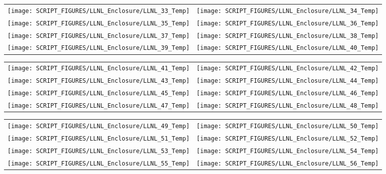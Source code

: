 \begin{figure}[!ht]
\begin{tabular*}{\textwidth}{l@{\extracolsep{\fill}}r}
\texttt{[image: SCRIPT\_FIGURES/LLNL\_Enclosure/LLNL\_33\_Temp]} &
\texttt{[image: SCRIPT\_FIGURES/LLNL\_Enclosure/LLNL\_34\_Temp]} \\
\texttt{[image: SCRIPT\_FIGURES/LLNL\_Enclosure/LLNL\_35\_Temp]} &
\texttt{[image: SCRIPT\_FIGURES/LLNL\_Enclosure/LLNL\_36\_Temp]} \\
\texttt{[image: SCRIPT\_FIGURES/LLNL\_Enclosure/LLNL\_37\_Temp]} &
\texttt{[image: SCRIPT\_FIGURES/LLNL\_Enclosure/LLNL\_38\_Temp]} \\
\texttt{[image: SCRIPT\_FIGURES/LLNL\_Enclosure/LLNL\_39\_Temp]} &
\texttt{[image: SCRIPT\_FIGURES/LLNL\_Enclosure/LLNL\_40\_Temp]}
\end{tabular*}
\label{LLNL_Enclosure_Temp_5}
\end{figure}

\begin{figure}[!ht]
\begin{tabular*}{\textwidth}{l@{\extracolsep{\fill}}r}
\texttt{[image: SCRIPT\_FIGURES/LLNL\_Enclosure/LLNL\_41\_Temp]} &
\texttt{[image: SCRIPT\_FIGURES/LLNL\_Enclosure/LLNL\_42\_Temp]} \\
\texttt{[image: SCRIPT\_FIGURES/LLNL\_Enclosure/LLNL\_43\_Temp]} &
\texttt{[image: SCRIPT\_FIGURES/LLNL\_Enclosure/LLNL\_44\_Temp]} \\
\texttt{[image: SCRIPT\_FIGURES/LLNL\_Enclosure/LLNL\_45\_Temp]} &
\texttt{[image: SCRIPT\_FIGURES/LLNL\_Enclosure/LLNL\_46\_Temp]} \\
\texttt{[image: SCRIPT\_FIGURES/LLNL\_Enclosure/LLNL\_47\_Temp]} &
\texttt{[image: SCRIPT\_FIGURES/LLNL\_Enclosure/LLNL\_48\_Temp]}
\end{tabular*}
\label{LLNL_Enclosure_Temp_6}
\end{figure}

\begin{figure}[!ht]
\begin{tabular*}{\textwidth}{l@{\extracolsep{\fill}}r}
\texttt{[image: SCRIPT\_FIGURES/LLNL\_Enclosure/LLNL\_49\_Temp]} &
\texttt{[image: SCRIPT\_FIGURES/LLNL\_Enclosure/LLNL\_50\_Temp]} \\
\texttt{[image: SCRIPT\_FIGURES/LLNL\_Enclosure/LLNL\_51\_Temp]} &
\texttt{[image: SCRIPT\_FIGURES/LLNL\_Enclosure/LLNL\_52\_Temp]} \\
\texttt{[image: SCRIPT\_FIGURES/LLNL\_Enclosure/LLNL\_53\_Temp]} &
\texttt{[image: SCRIPT\_FIGURES/LLNL\_Enclosure/LLNL\_54\_Temp]} \\
\texttt{[image: SCRIPT\_FIGURES/LLNL\_Enclosure/LLNL\_55\_Temp]} &
\texttt{[image: SCRIPT\_FIGURES/LLNL\_Enclosure/LLNL\_56\_Temp]}
\end{tabular*}
\label{LLNL_Enclosure_Temp_7}
\end{figure}

